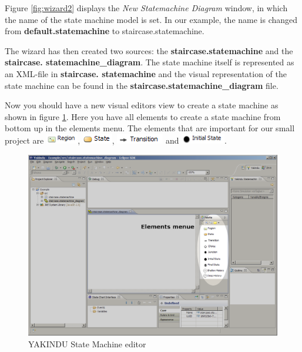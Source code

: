 Figure \ref{fig:wizard2} displays the \textit{New Statemachine Diagram} window,
in which the name of the state machine model is set. In our example, the name is
changed from \textbf{default.statemachine} to staircase.statemachine.

The wizard has then created two sources: the \textbf{staircase.state\-machine}
and the \textbf{staircase. state\-machine\_\-diagram}. The state machine itself
is represented as an XML-file in \textbf{staircase. state\-machine} and the
visual representation of the state machine can be found in the
\textbf{staircase.state\-machine\_\-diagram} file.


Now you should have a new visual editors view to create a state machine as shown
in figure \ref{fig:YEditor}. Here you have all elements to create a state machine
from bottom up in the elements menu. The elements that are important for our
small project are \includegraphics[height=12pt]{./Pictures/Region},
\includegraphics[height=12pt]{./Pictures/State},
\includegraphics[height=12pt]{./Pictures/Transition} and
\includegraphics[height=12pt]{./Pictures/InitialState}.

\begin{figure}[ht]
\center
\includegraphics[width=\textwidth]{./Pictures/YakinduEditor_1}
\caption{\label{fig:YEditor}YAKINDU State Machine editor}
\end{figure}
 

